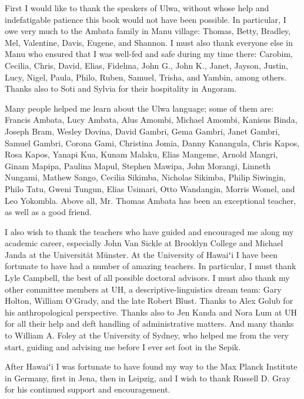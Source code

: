 \addchap{\lsAcknowledgementTitle}
First I would like to thank the speakers of Ulwa, without whose help and indefatigable patience this book would not have been possible. In particular, I owe very much to the Ambata family in Manu village: Thomas, Betty, Bradley, Mel, Valentine, Davis, Eugene, and Shannon. I must also thank everyone else in Manu who ensured that I was well-fed and safe during my time there: Carobim, Cecilia, Chris, David, Elias, Fidelma, John G., John K., Janet, Jayson, Justin, Lucy, Nigel, Paula, Philo, Ruben, Samuel, Trisha, and Yambin, among others. Thanks also to Soti and Sylvia for their hospitality in Angoram.

Many people helped me learn about the Ulwa language; some of them are: Francis Ambata, Lucy Ambata, Alus Amombi, Michael Amombi, Kanisus Binda, Joseph Bram, Wesley Dovina, David Gambri, Gema Gambri, Janet Gambri, \linebreak Samuel Gambri, Corona Gami, Christina Jomia, Danny Kanangula, Chris \linebreak Kapos, Rosa Kapos, Yanapi Kua, Kunam Malaku, Elias Mangeme, Arnold \linebreak Mangri, Ginam Mapipa, Paulina Mapul, Stephen Mawipa, John Morangi, Linneth Nungami, Mathew Sango, Cecilia Sikimba, Nicholas Sikimba, Philip Siwingin, Philo Tatu, Gweni Tungun, Elias Usimari, Otto Wandangin, Morris Womel, and Leo Yokombla. Above all, Mr. Thomas Ambata has been an exceptional teacher, as well as a good friend.


I also wish to thank the teachers who have guided and encouraged me along my academic career, especially John Van Sickle at Brooklyn College and Michael Janda at the Universität Münster. At the University of Hawaiʻi I have been fortunate to have had a number of amazing teachers. In particular, I must thank Lyle Campbell, the best of all possible doctoral advisors. I must also thank my other committee members at UH, a descriptive-linguistics dream team: Gary Holton, William O’Grady, and the late Robert Blust. Thanks to Alex Golub for his anthropological perspective. Thanks also to Jen Kanda and Nora Lum at UH for all their help and deft handling of administrative matters. And many thanks to William A. Foley at the University of Sydney, who helped me from the very start, guiding and advising me before I ever set foot in the Sepik.

After Hawaiʻi I was fortunate to have found my way to the Max Planck Institute in Germany, first in Jena, then in Leipzig, and I wish to thank Russell D. Gray for his continued support and encouragement.

